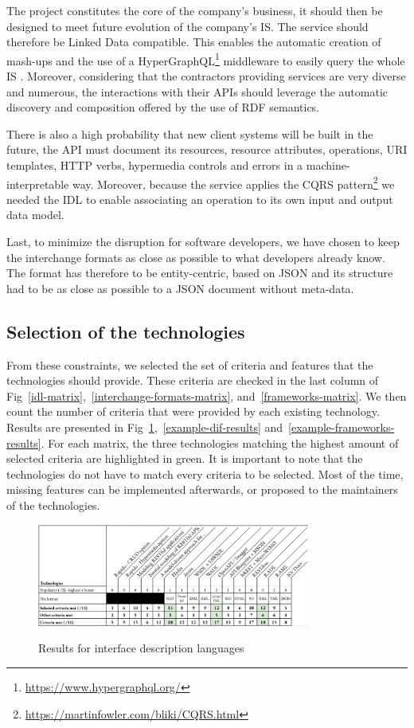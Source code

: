 The project constitutes the core of the company's business, it should then be designed to meet future evolution of the company's IS. 
The service should therefore be Linked Data compatible. This enables the automatic creation of mash-ups and the use of a HyperGraphQL\footnote{\url{https://www.hypergraphql.org/}} middleware to easily query the whole IS \cite{Tuchinda:2011:BMD:1993053.1993058}.
Moreover, considering that the contractors providing services are very diverse and numerous, the interactions with their APIs should leverage the automatic discovery and composition offered by the use of RDF semantics.

There is also a high probability that new client systems will be built in the future, the API must document its resources, resource attributes, operations, URI templates, HTTP verbs, hypermedia controls and errors in a machine-interpretable way. Moreover, because the service applies the CQRS pattern\footnote{\url{https://martinfowler.com/bliki/CQRS.html}} we needed the IDL to enable associating an operation to its own input and output data model.

Last, to minimize the disruption for software developers, we have chosen to keep the interchange formats  as close as possible to what developers already know. The format has therefore to be entity-centric, based on JSON and its structure had to be as close as possible to a JSON document without meta-data.

\subsection{Selection of the technologies}

From these constraints, we selected the set of criteria and features that the technologies should provide. These criteria are checked  in the last column  of Fig~\ref{idl-matrix},~\ref{interchange-formats-matrix}, and~\ref{frameworks-matrix}. 
We then count the number of criteria that were provided by each existing technology. 
Results are presented in Fig~\ref{example-idl-results},~\ref{example-dif-results} and~\ref{example-frameworks-results}. 
For each matrix, the three technologies matching the highest amount of selected criteria are highlighted in green.
It is important to note that the technologies do not have to match every criteria to be selected.
Most of the time, missing features can be implemented afterwards, or proposed to the maintainers of the technologies.
\vspace*{-0.5cm}
\begin{figure}[ht]
\caption{Results for interface description languages}
\centering
\includegraphics[width=0.8\textwidth]{figures/example-idl-results.png}
\label{example-idl-results}
\vspace*{-0.5cm}
\end{figure}

